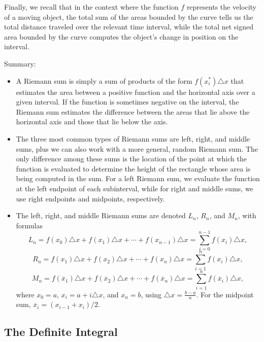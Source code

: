 Finally, we recall that in the context where the function $f$ represents the velocity of a moving object, the total sum of the areas bounded by the curve tells us the total distance traveled over the relevant time interval, while the total net signed area bounded by the curve computes the object's change in position on the interval.

Summary:
\begin{itemize}
\item A Riemann sum is simply a sum of products of the form $f(x_i^*) \triangle x$ that estimates the area between a positive function and the horizontal axis over a given interval.  If the function is sometimes negative on the interval, the Riemann sum estimates the difference between the areas that lie above the horizontal axis and those that lie below the axis.
\item The three most common types of Riemann sums are left, right, and middle sums, plus we can also work with a more general, random Riemann sum.  The only difference among these sums is the location of the point at which the function is evaluated to determine the height of the rectangle whose area is being computed in the sum.  For a left Riemann sum, we evaluate the function at the left endpoint of each subinterval, while for right and middle sums, we use right endpoints and midpoints, respectively.
\item The left, right, and middle Riemann sums are denoted $L_n$, $R_n$, and $M_n$, with formulas
$$L_n = f(x_0) \triangle x + f(x_1) \triangle x + \cdots + f(x_{n-1}) \triangle x = \sum_{i = 0}^{n-1} f(x_i) \triangle x,$$
$$R_n = f(x_1) \triangle x + f(x_2) \triangle x + \cdots + f(x_{n}) \triangle x = \sum_{i = 1}^{n} f(x_i) \triangle x,$$
$$M_n = f(\overline{x}_1) \triangle x + f(\overline{x}_2) \triangle x + \cdots + f(\overline{x}_{n}) \triangle x = \sum_{i = 1}^{n} f(\overline{x}_i) \triangle x,$$
where $x_0 = a$, $x_i = a + i\triangle x$, and $x_n = b$, using $\triangle x = \frac{b-a}{n}$.  For the midpoint sum, $\overline{x}_{i} = (x_{i-1} + x_i)/2$.
\end{itemize}

\subsection{The Definite Integral}

